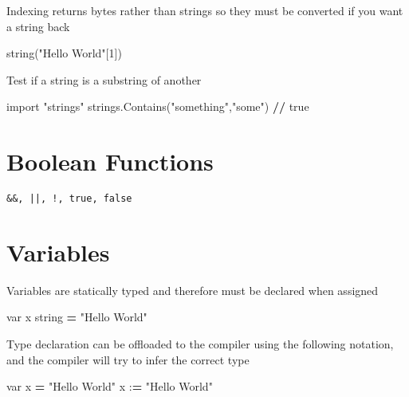 \documentclass[]{book}
\newenvironment{Shaded}{\begin{snugshade}}{\end{snugshade}}
\newcommand{\DecValTok}[1]{\textcolor[rgb]{0.00,0.00,0.81}{#1}}
\newcommand{\StringTok}[1]{\textcolor[rgb]{0.31,0.60,0.02}{#1}}
\newcommand{\ImportTok}[1]{#1}
\newcommand{\OperatorTok}[1]{\textcolor[rgb]{0.81,0.36,0.00}{\textbf{#1}}}
\newcommand{\NormalTok}[1]{#1}
\begin{document}
Indexing returns bytes rather than strings so they must be converted if
you want a string back

\begin{Shaded}
\begin{Highlighting}[]
\NormalTok{string(}\StringTok{"Hello World"}\NormalTok{[}\DecValTok{1}\NormalTok{])}
\end{Highlighting}
\end{Shaded}

Test if a string is a substring of another

\begin{Shaded}
\begin{Highlighting}[]
\ImportTok{import} \StringTok{"strings"}
\NormalTok{strings.Contains(}\StringTok{"something"}\NormalTok{,}\StringTok{"some"}\NormalTok{) }\OperatorTok{//}\NormalTok{ true}
\end{Highlighting}
\end{Shaded}

\section{Boolean Functions}\label{boolean-functions}

\begin{verbatim}
&&, ||, !, true, false
\end{verbatim}

\section{Variables}\label{variables}

Variables are statically typed and therefore must be declared when
assigned

\begin{Shaded}
\begin{Highlighting}[]
\NormalTok{var x string }\OperatorTok{=} \StringTok{"Hello World"}
\end{Highlighting}
\end{Shaded}

Type declaration can be offloaded to the compiler using the following
notation, and the compiler will try to infer the correct type

\begin{Shaded}
\begin{Highlighting}[]
\NormalTok{var x }\OperatorTok{=} \StringTok{"Hello World"}
\NormalTok{x :}\OperatorTok{=} \StringTok{"Hello World"}
\end{Highlighting}
\end{Shaded}
\end{document}
